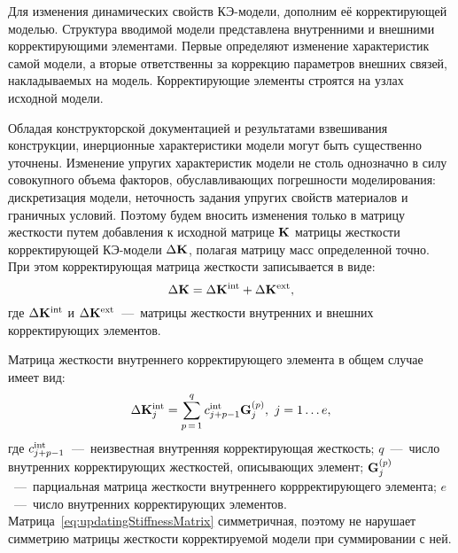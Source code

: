 Для изменения динамических свойств КЭ-модели, дополним её корректирующей моделью. Структура вводимой модели представлена внутренними и внешними корректирующими элементами. Первые определяют изменение характеристик самой модели, а вторые ответственны за коррекцию параметров внешних связей, накладываемых на модель. Корректирующие элементы строятся на узлах исходной модели. 

Обладая конструкторской документацией и результатами взвешивания конструкции, инерционные характеристики модели могут быть существенно уточнены. Изменение упругих характеристик модели не столь однозначно в силу совокупного объема факторов, обуславливающих погрешности моделирования: дискретизация модели, неточность задания упругих свойств материалов и граничных условий. Поэтому будем вносить изменения только в матрицу жесткости путем добавления к исходной матрице $ \mathbf{K} $ матрицы жесткости корректирующей КЭ-модели $ \Delta \mathbf{K} $, полагая матрицу масс определенной точно. При этом корректирующая матрица жесткости записывается в виде:
\begin{equation}
	\Delta \mathbf{K} = \Delta \mathbf{K} ^ {\text{int}} + \Delta \mathbf{K} ^ {\text{ext}}, \label{eq:stiffMatrixDecomposition}
\end{equation}
где $ \Delta \mathbf{K} ^ {\text{int}} $ и $ \Delta \mathbf{K} ^ {\text{ext}} $~---~матрицы жесткости внутренних и внешних корректирующих элементов.

Матрица жесткости внутреннего корректирующего элемента в общем случае имеет вид:
\begin{equation}
	\Delta \mathbf{K} ^ {\text{int}}_j = \sum\limits_{p\,=\,1}^{q} c ^ {\text{int}}_{j+p-1} \mathbf{G}_j^{(p)}, \ j = 1 \hdots e, \label{eq:updatingStiffnessMatrix}
\end{equation}
где $ c ^ {\text{int}}_{j+p-1} $~---~неизвестная внутренняя корректирующая жесткость; $ q $~---~число внутренних корректирующих жесткостей, описывающих элемент; $ \mathbf{G}_j^{(p)} $~---~парциальная матрица жесткости внутреннего коррректирующего элемента; $ e $~---~число внутренних корректирующих элементов. Матрица~\eqref{eq:updatingStiffnessMatrix} симметричная, поэтому не нарушает симметрию матрицы жесткости корректируемой модели при суммировании с ней.

